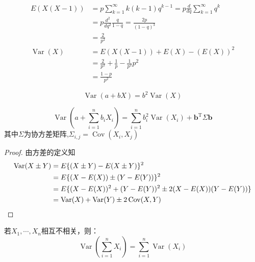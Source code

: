 \begin{example}[微分法求解几何分布方差]\label{ex:geometric_dist_var}
    \begin{align*}
        E(X(X-1))             & =p\sum_{k=1}^{\infty}k(k-1) q^{k-1}=p\frac{d}{d q}\sum_{k=1}^{\infty} q^{k} \\
                              & =p\frac{d^2}{d q^2} \frac{q}{1-q} =\frac{2p}{(1-q)^{3}}                     \\
                              & =\frac{2}{p^2}                                                              \\
        \operatorname{Var}(X) & =  E(X(X-1)) + E(X) - (E(X))^2                                              \\
                              & = \frac{2}{p^2} + \frac{1}{p} -\frac{1}{p^2} p^2                            \\
                              & = \frac{1-p}{p^2}
    \end{align*}
\end{example}

\begin{proposition}
    \[ \operatorname{Var}(a+bX)=b^2\operatorname{Var}(X) \]
\end{proposition}

\begin{proposition}
    \[ \operatorname{Var}(a+\sum_{i=1}^n b_i X_i)=\sum_{i=1}^n b_i^2 \operatorname{Var}(X_i)+\mathbf{b}^{\mathrm{T}} \Sigma \mathbf{b}\]
    其中$\Sigma$为协方差矩阵,$\Sigma_{i,j}=\operatorname{Cov}(X_i,X_j)$
\end{proposition}
\begin{proof}
    由方差的定义知
    \begin{align*}
        \operatorname{Var}(X \pm Y) & =E\{(X \pm Y)-E(X \pm Y)\}^2                      \\
                      & =E\{(X-E(X)) \pm(Y-E(Y))\}^2                      \\
                      & =E\{(X-E(X))^2+(Y-E(Y))^2 \pm 2(X-E(X))(Y-E(Y))\} \\
                      & =\operatorname{Var}(X)+\operatorname{Var}(Y) \pm 2 \operatorname{Cov}(X, Y)
    \end{align*}
\end{proof}

\begin{corollary}
    若$X_1,\cdots ,X_n$相互不相关，则：
    \[ \operatorname{Var}(\sum_{i=1}^n X_i)=\sum_{i=1}^n\operatorname{Var}( X_i) \]
\end{corollary}

